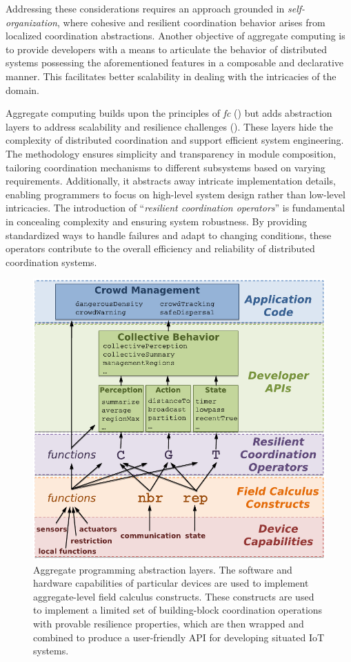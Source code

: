 Addressing these considerations requires an approach grounded in \textit{self-organization}, where cohesive and resilient coordination behavior arises from localized coordination abstractions. Another objective of aggregate computing is to provide developers with a means to articulate the behavior of distributed systems possessing the aforementioned features in a composable and declarative manner. This facilitates better scalability in dealing with the intricacies of the domain.

Aggregate computing builds upon the principles of \textit{\ac{fc}} () but adds abstraction layers to address scalability and resilience challenges (). These layers hide the complexity of distributed coordination and support efficient system engineering. The methodology ensures simplicity and transparency in module composition, tailoring coordination mechanisms to different subsystems based on varying requirements. Additionally, it abstracts away intricate implementation details, enabling programmers to focus on high-level system design rather than low-level intricacies. The introduction of ``\textit{resilient coordination operators}'' is fundamental in concealing complexity and ensuring system robustness. By providing standardized ways to handle failures and adapt to changing conditions, these operators contribute to the overall efficiency and reliability of distributed coordination systems.

\begin{figure}
    \centering
    \includegraphics[width=.8\linewidth]{figures/aggregate-programming-abstraction-layers.png}
    \caption{Aggregate programming abstraction layers. The software and hardware capabilities of particular devices are used to implement aggregate-level field
    calculus constructs. These constructs are used to implement a limited set of building-block coordination operations with provable resilience properties,
    which are then wrapped and combined to produce a user-friendly API for developing situated \ac{IoT} systems.}
    \label{fig:aggregate-abstraction-layers}
\end{figure}

